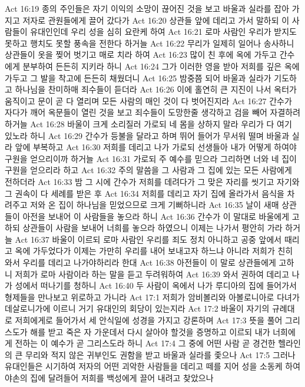Act 16:19  종의 주인들은 자기 이익의 소망이 끊어진 것을 보고 바울과 실라를 잡아 가지고 저자로 관원들에게 끌어 갔다가
Act 16:20  상관들 앞에 데리고 가서 말하되 이 사람들이 유대인인데 우리 성을 심히 요란케 하여
Act 16:21  로마 사람인 우리가 받지도 못하고 행치도 못할 풍속을 전한다 하거늘
Act 16:22  무리가 일제히 일어나 송사하니 상관들이 옷을 찢어 벗기고 매로 치라 하여
Act 16:23  많이 친 후에 옥에 가두고 간수에게 분부하여 든든히 지키라 하니
Act 16:24  그가 이러한 영을 받아 저희를 깊은 옥에 가두고 그 발을 착고에 든든히 채웠더니
Act 16:25  밤중쯤 되어 바울과 실라가 기도하고 하나님을 찬미하매 죄수들이 듣더라
Act 16:26  이에 홀연히 큰 지진이 나서 옥터가 움직이고 문이 곧 다 열리며 모든 사람의 매인 것이 다 벗어진지라
Act 16:27  간수가 자다가 깨어 옥문들이 열린 것을 보고 죄수들이 도망한줄 생각하고 검을 빼어 자결하려 하거늘
Act 16:28  바울이 크게 소리질러 가로되 네 몸을 상하지 말라 우리가 다 여기 있노라 하니
Act 16:29  간수가 등불을 달라고 하며 뛰어 들어가 무서워 떨며 바울과 실라 앞에 부복하고
Act 16:30  저희를 데리고 나가 가로되 선생들아 내가 어떻게 하여야 구원을 얻으리이까 하거늘
Act 16:31  가로되 주 예수를 믿으라 그리하면 너와 네 집이 구원을 얻으리라 하고
Act 16:32  주의 말씀을 그 사람과 그 집에 있는 모든 사람에게 전하더라
Act 16:33  밤 그 시에 간수가 저희를 데려다가 그 맞은 자리를 씻기고 자기와 그 권속이 다 세례를 받은 후
Act 16:34  저희를 데리고 자기 집에 올라가서 음식을 차려주고 저와 온 집이 하나님을 믿었으므로 크게 기뻐하니라
Act 16:35  날이 새매 상관들이 아전을 보내어 이 사람들을 놓으라 하니
Act 16:36  간수가 이 말대로 바울에게 고하되 상관들이 사람을 보내어 너희를 놓으라 하였으니 이제는 나가서 평안히 가라 하거늘
Act 16:37  바울이 이르되 로마 사람인 우리를 죄도 정치 아니하고 공중 앞에서 때리고 옥에 가두었다가 이제는 가만히 우리를 내어 보내고자 하느냐 아니라 저희가 친히 와서 우리를 데리고 나가야하리라 한대
Act 16:38  아전들이 이 말로 상관들에게 고하니 저희가 로마 사람이라 하는 말을 듣고 두려워하여
Act 16:39  와서 권하여 데리고 나가 성에서 떠나기를 청하니
Act 16:40  두 사람이 옥에서 나가 루디아의 집에 들어가서 형제들을 만나보고 위로하고 가니라
Act 17:1  저희가 암비볼리와 아볼로니아로 다녀가 데살로니가에 이르니 거기 유대인의 회당이 있는지라
Act 17:2  바울이 자기의 규례대로 저희에게로 들어가서 세 안식일에 성경을 가지고 강론하며
Act 17:3  뜻을 풀어 그리스도가 해를 받고 죽은 자 가운데서 다시 살아야 할것을 증명하고 이르되 내가 너희에게 전하는 이 예수가 곧 그리스도라 하니
Act 17:4  그 중에 어떤 사람 곧 경건한 헬라인의 큰 무리와 적지 않은 귀부인도 권함을 받고 바울과 실라를 좇으나
Act 17:5  그러나 유대인들은 시기하여 저자의 어떤 괴악한 사람들을 데리고 떼를 지어 성을 소동케 하여 야손의 집에 달려들어 저희를 백성에게 끌어 내려고 찾았으나
